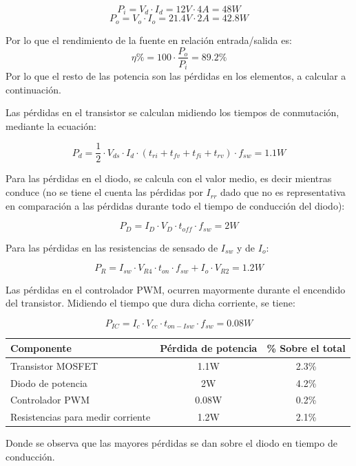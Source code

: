 \documentclass[e4_tp2_main.tex]{subfiles}
\begin{document}
\[
P_i = V_d \cdot I_d = 12V \cdot 4A = 48W  
\]
\[
P_o = V_o \cdot I_o = 21.4V \cdot 2A = 42.8W
\]

Por lo que el rendimiento de la fuente en relación entrada/salida es:
\[
\eta \% = 100 \cdot \frac{P_o}{P_i} = 89.2 \%
\]
Por lo que el resto de las potencia son las pérdidas en los elementos, a calcular a continuación.\par

Las pérdidas en el transistor se calculan midiendo los tiempos de conmutación, mediante la ecuación:

\[
P_d = \frac{1}{2} \cdot V_{ds} \cdot I_d \cdot (t_{ri} + t_{fv} + t_{fi} + t_{rv}) \cdot f_{sw} = 1.1W
\]

Para las pérdidas en el diodo, se calcula con el valor medio, es decir mientras conduce (no se tiene el cuenta las pérdidas por $I_{rr}$ dado que no es representativa en comparación a las pérdidas durante todo el tiempo de conducción del diodo):

\[
P_D = I_D \cdot V_D \cdot t_{off} \cdot f_{sw} = 2W
\]

Para las pérdidas en las resistencias de sensado de $I_{sw}$ y de $I_o$:

\[
P_{R} = I_{sw} \cdot V_{R4} \cdot t_{on} \cdot f_{sw} + I_o \cdot V_{R2} = 1.2W  
\]

Las pérdidas en el controlador PWM, ocurren mayormente durante el encendido del transistor. Midiendo el tiempo que dura dicha corriente, se tiene:

\[
P_{IC} = I_c \cdot V_{cc} \cdot t_{on-Isw} \cdot f_{sw} = 0.08W
\]

\begin{table}[h]
\centering
\begin{tabular}{|l|c|c|}
\hline
Componente                        & \multicolumn{1}{l|}{Pérdida de potencia} & \multicolumn{1}{l|}{\% Sobre el total} \\ \hline
Transistor MOSFET                 & 1.1W                                     & 2.3\%                                  \\ \hline
Diodo de potencia                 & 2W                                       & 4.2\%                                  \\ \hline
Controlador PWM                   & 0.08W                                    & 0.2\%                                  \\ \hline
Resistencias para medir corriente & 1.2W                                       & 2.1\%                                  \\ \hline
\end{tabular}
\end{table}

Donde se observa que las mayores pérdidas se dan sobre el diodo en tiempo de conducción.
\end{document}
